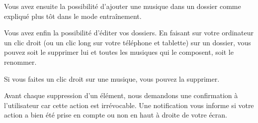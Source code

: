 \documentclass[12pt,french]{article}
\begin{document}
Vous avez ensuite la possibilité d'ajouter une musique dans un dossier comme expliqué plus tôt dans le mode entraînement.

Vous avez enfin la possibilité d'éditer vos dossiers. En faisant sur votre ordinateur un clic droit (ou un clic long sur votre téléphone et tablette) sur un dossier, vous pouvez soit le supprimer lui et toutes les musiques qui le composent, soit le renommer.

Si vous faites un clic droit sur une musique, vous pouvez la supprimer.

Avant chaque suppression d'un élément, nous demandons une confirmation à l'utilisateur car cette action est irrévocable. Une notification vous informe si votre action a bien été prise en compte ou non en haut à droite de votre écran.
\end{document}
